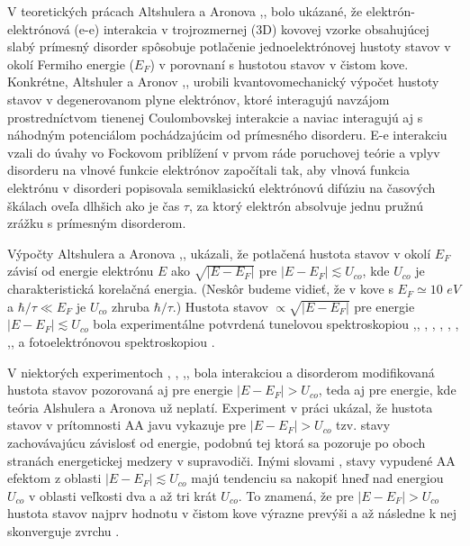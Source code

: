 
V teoretických prácach Altshulera a Aronova \cite{Altshuler1},\cite{Altshuler3},\cite{Altshuler4} bolo ukázané,
 že elektrón-elektrónová (e-e) interakcia v trojrozmernej (3D) kovovej vzorke obsahujúcej slabý prímesný disorder spôsobuje potlačenie jednoelektrónovej hustoty
 stavov v okolí Fermiho energie ($E_F$) v porovnaní s hustotou stavov v čistom kove. Konkrétne, Altshuler a Aronov \cite{Altshuler1},\cite{Altshuler3},\cite{Altshuler4} urobili kvantovomechanický výpočet hustoty
stavov v degenerovanom plyne elektrónov, ktoré interagujú navzájom prostredníctvom tienenej Coulombovskej interakcie a naviac interagujú aj 
s náhodným potenciálom pochádzajúcim od prímesného disorderu. E-e interakciu vzali do úvahy vo Fockovom priblížení v prvom ráde poruchovej teórie a
vplyv disorderu na vlnové funkcie elektrónov započítali tak, aby vlnová funkcia elektrónu v disorderi popisovala semiklasickú elektrónovú difúziu na časových škálach oveľa dlhšich ako je čas
$\tau$, za ktorý elektrón absolvuje jednu pružnú zrážku s prímesným disorderom.    
 


 Výpočty Altshulera a Aronova \cite{Altshuler1},\cite{Altshuler3},\cite{Altshuler4} ukázali,
 že potlačená hustota stavov v okolí $E_F$ závisí od energie elektrónu $E$ ako $\sqrt{|E-E_F|}$ pre $|E-E_F| \lesssim U_{co}$, kde $U_{co}$
 je charakteristická korelačná energia. (Neskôr budeme vidieť, že v kove s $E_F \simeq 10$ $eV$ a $\hbar/\tau \ll E_F$ je
 $U_{co}$ zhruba  $\hbar/\tau$.)
 Hustota stavov $\propto \sqrt{|E-E_F|}$ pre energie $|E-E_F| \lesssim U_{co}$ bola experimentálne potvrdená tunelovou spektroskopiou \cite{Abeles},\cite{Dynes},\cite{McMillan2}
\cite{ImryOvadyahu}, \cite{Schmitz1}, \cite{Schmitz2}, \cite{Escudero}, \cite{Teizer}, \cite{Mazur},\cite{Luna2014}, \cite{Luna2015} a fotoelektrónovou spektroskopiou \cite{Kobayashi}.

V niektorých experimentoch \cite{Schmitz1}, \cite{Schmitz2}, \cite{Escudero},\cite{Mazur}, \cite{Kobayashi}
bola interakciou a disorderom modifikovaná hustota stavov pozorovaná aj pre energie $|E-E_F| > U_{co}$, teda aj pre energie, kde teória Alshulera a Aronova už neplatí. Experiment v práci \cite{Mazur} ukázal, že hustota stavov v prítomnosti AA javu vykazuje pre $|E-E_F| > U_{co}$ tzv. stavy zachovávajúcu závislosť od energie, podobnú tej ktorá sa pozoruje po oboch stranách
energetickej medzery v supravodiči. Inými slovami \cite{Mazur},
stavy vypudené AA efektom z oblasti $|E-E_F| \lesssim U_{co}$ majú tendenciu sa nakopiť hneď nad energiou $U_{co}$ v oblasti veľkosti dva a až tri krát $U_{co}$.
To znamená, že pre $|E-E_F| > U_{co}$ hustota stavov najprv hodnotu v čistom kove
výrazne prevýši a až následne k nej skonverguje zvrchu \cite{Mazur}.


